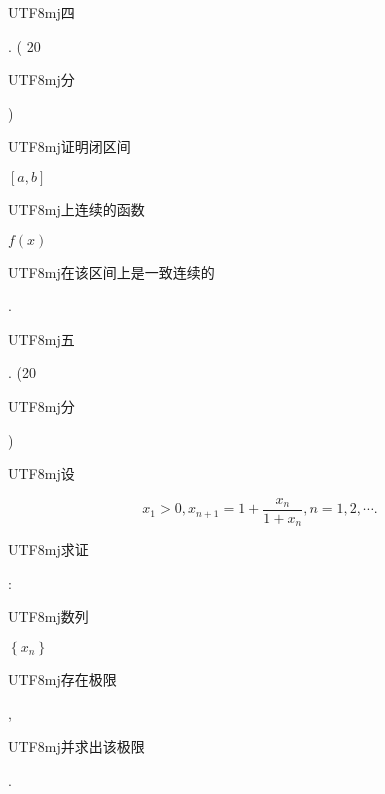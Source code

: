 \documentclass[10pt]{article}
\begin{document}
\begin{CJK}{UTF8}{mj}四\end{CJK}. ( 20 \begin{CJK}{UTF8}{mj}分\end{CJK}) \begin{CJK}{UTF8}{mj}证明闭区间\end{CJK} $[a, b]$ \begin{CJK}{UTF8}{mj}上连续的函数\end{CJK} $f(x)$ \begin{CJK}{UTF8}{mj}在该区间上是一致连续的\end{CJK}.

\begin{CJK}{UTF8}{mj}五\end{CJK}. (20 \begin{CJK}{UTF8}{mj}分\end{CJK}) \begin{CJK}{UTF8}{mj}设\end{CJK}
$$
x_{1}>0, x_{n+1}=1+\frac{x_{n}}{1+x_{n}}, n=1,2, \cdots .
$$
\begin{CJK}{UTF8}{mj}求证\end{CJK}: \begin{CJK}{UTF8}{mj}数列\end{CJK} $\left\{x_{n}\right\}$ \begin{CJK}{UTF8}{mj}存在极限\end{CJK}, \begin{CJK}{UTF8}{mj}并求出该极限\end{CJK}.
\end{document}
